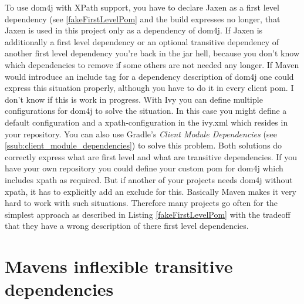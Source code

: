 To use dom4j with XPath support, you have to declare Jaxen as a first level dependency (see \ref{fakeFirstLevelPom} and the build expresses no longer, that Jaxen is used in this project only as a dependency of dom4j. If Jaxen is additionally a first level dependency or an optional transitive dependency of another first level dependency you’re back in the jar hell, because you don’t know which dependencies to remove if some others are not needed any longer. If Maven would introduce an include tag for a dependency description of dom4j one could express this situation properly, although you have to do it in every client pom. I don’t know if this is work in progress. With Ivy you can define multiple configurations for dom4j to solve the situation. In this case you might define a default configuration and a xpath-configuration in the ivy.xml which resides in your repository. You can also use Gradle's \emph{Client Module Dependencies} (see \ref{ssub:client_module_dependencies}) to solve this problem. Both solutions do correctly express what are first level and what are transitive dependencies. If you have your own repository you could define your custom pom for dom4j which includes xpath as required. But if another of your projects needs dom4j without xpath, it has to explicitly add an exclude for this. Basically Maven makes it very hard to work with such situations. Therefore many projects go often for the simplest approach as described in Listing \ref{fakeFirstLevelPom} with the tradeoff that they have a wrong description of there first level dependencies.


\section{Mavens inflexible transitive dependencies} %
\label{sec:mavens_inflexible_transitive_dependencies}

